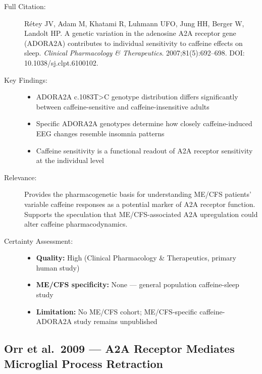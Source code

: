 \begin{description}
    \item[Full Citation:] R\'{e}tey JV, Adam M, Khatami R, Luhmann UFO, Jung HH, Berger W, Landolt HP\@. A genetic variation in the adenosine A2A receptor gene (ADORA2A) contributes to individual sensitivity to caffeine effects on sleep. \textit{Clinical Pharmacology \& Therapeutics}. 2007;81(5):692--698. DOI: 10.1038/sj.clpt.6100102.
    \item[Key Findings:]
    \begin{itemize}
        \item ADORA2A c.1083T>C genotype distribution differs significantly between caffeine-sensitive and caffeine-insensitive adults
        \item Specific ADORA2A genotypes determine how closely caffeine-induced EEG changes resemble insomnia patterns
        \item Caffeine sensitivity is a functional readout of A2A receptor sensitivity at the individual level
    \end{itemize}
    \item[Relevance:] Provides the pharmacogenetic basis for understanding ME/CFS patients' variable caffeine responses as a potential marker of A2A receptor function. Supports the speculation that ME/CFS-associated A2A upregulation could alter caffeine pharmacodynamics.
    \item[Certainty Assessment:]
    \begin{itemize}
        \item \textbf{Quality:} High (Clinical Pharmacology \& Therapeutics, primary human study)
        \item \textbf{ME/CFS specificity:} None --- general population caffeine-sleep study
        \item \textbf{Limitation:} No ME/CFS cohort; ME/CFS-specific caffeine-ADORA2A study remains unpublished
    \end{itemize}
\end{description}

\subsection{Orr et al.\ 2009 --- A2A Receptor Mediates Microglial Process Retraction}


